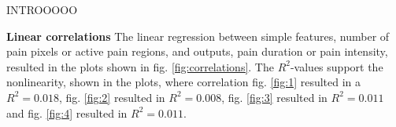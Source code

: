 INTROOOOO

\textbf{Linear correlations}\newline
\noindent
The linear regression between simple features, number of pain pixels or active pain regions, and outputs, pain duration or pain intensity, resulted in the plots shown in fig. \ref{fig:correlations}. The $R^2$-values support the nonlinearity, shown in the plots, where correlation fig. \ref{fig:1} resulted in a $R^2 = 0.018$, fig. \ref{fig:2} resulted in $R^2 = 0.008$, fig. \ref{fig:3} resulted in $R^2 = 0.011$ and fig. \ref{fig:4} resulted in $R^2 =  0.011$. \\

\begin{figure} [t!]
\end{figure}
